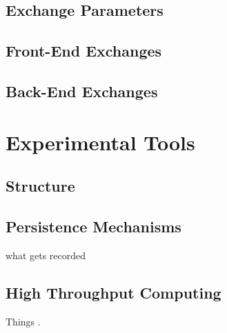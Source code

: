 \subsection{Exchange Parameters}\label{method:setup:params}

\subsection{Front-End Exchanges}\label{method:setup:front}

\subsection{Back-End Exchanges}\label{method:setup:back}

\section{Experimental Tools}\label{method:tools}

\subsection{Structure}\label{method:tools:struc}

\subsection{Persistence Mechanisms}\label{method:tools:hdf5}

what gets recorded

\subsection{High Throughput Computing}\label{method:tools:htc}

Things \cite{bui_work_2011}.
